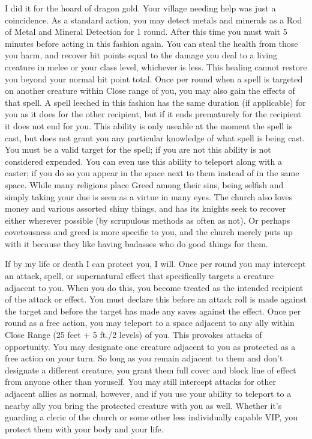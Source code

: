 \begin{optional}
{I did it for the hoard of dragon gold. Your village needing help was just a coincidence.}
{As a standard action, you may detect metals and minerals as a Rod of Metal and Mineral Detection for 1 round. After this time you must wait 5 minutes before acting in this fashion again.}
{You can steal the health from those you harm, and recover hit points equal to the damage you deal to a living creature in melee or your class level, whichever is less. This healing cannot restore you beyond your normal hit point total.}
{Once per round when a spell is targeted on another creature within Close range of you, you may also gain the effects of that spell. A spell leeched in this fashion has the same duration (if applicable) for you as it does for the other recipient, but if it ends prematurely for the recipient it does not end for you. This ability is only useable at the moment the spell is cast, but does not grant you any particular knowledge of what spell is being cast. You must be a valid target for the spell; if you are not this ability is not considered expended. You can even use this ability to teleport along with a caster; if you do so you appear in the space next to them instead of in the same space.}
{While many religions place Greed among their sins, being selfish and simply taking your due is seen as a virtue in many eyes. The church also loves money and various assorted shiny things, and has its knights seek to recover either wherever possible (by scrupulous methods as often as not). Or perhaps covetousness and greed is more specific to you, and the church merely puts up with it because they like having badasses who do good things for them.}

{If by my life or death I can protect you, I will.}
{Once per round you may intercept an attack, spell, or supernatural effect that specifically targets a creature adjacent to you. When you do this, you become treated as the intended recipient of the attack or effect. You must declare this before an attack roll is made against the target and before the target has made any saves against the effect.}
{Once per round as a free action, you may teleport to a space adjacent to any ally within Close Range (25 feet + 5 ft./2 levels) of you. This provokes attacks of opportunity.}
{You may designate one creature adjacent to you as protected as a free action on your turn. So long as you remain adjacent to them and don't designate a different creature, you grant them full cover and block line of effect from anyone other than yoruself. You may still intercept attacks for other adjacent allies as normal, however, and if you use your ability to teleport to a nearby ally you bring the protected creature with you as well.}
{Whether it's guarding a cleric of the church or some other less individually capable VIP, you protect them with your body and your life.}


\end{optional}

